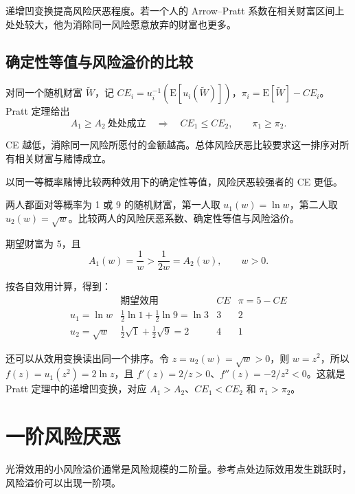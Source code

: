 递增凹变换提高风险厌恶程度。若一个人的 Arrow--Pratt 系数在相关财富区间上处处较大，他为消除同一风险愿意放弃的财富也更多。

\subsection{确定性等值与风险溢价的比较}
\begin{tcolorbox}[knowledge,title=同一风险的 CE 与溢价排序]
对同一个随机财富 $\widetilde W$，记 $CE_i=u_i^{-1}(\mathrm E[u_i(\widetilde W)])$，$\pi_i=\mathrm E[\widetilde W]-CE_i$。Pratt 定理给出
\[
 A_1\ge A_2\ \text{处处成立}
 \quad\Longrightarrow\quad CE_1\le CE_2,\qquad\pi_1\ge\pi_2.
\]
\end{tcolorbox}
CE 越低，消除同一风险所愿付的金额越高。总体风险厌恶比较要求这一排序对所有相关财富与赌博成立。

 以同一等概率赌博比较两种效用下的确定性等值，风险厌恶较强者的 CE 更低。


\begin{tcolorbox}[example,title=课堂例题：对数与平方根效用的比较]
\begin{question}
两人都面对等概率为 1 或 9 的随机财富，第一人取 $u_1(w)=\ln w$，第二人取 $u_2(w)=\sqrt w$。比较两人的风险厌恶系数、确定性等值与风险溢价。
\end{question}
\begin{solution}[blank-type=manual,blank-vsep=5\baselineskip]
期望财富为 5，且
\[
 A_1(w)=\frac1w>\frac1{2w}=A_2(w),\qquad w>0.
\]

按各自效用计算，得到：
\[
\begin{array}{c|c|c|c}
 &\text{期望效用}&CE&\pi=5-CE\\\hline
 u_1=\ln w&\tfrac12\ln1+\tfrac12\ln9=\ln3&3&2\\
 u_2=\sqrt w&\tfrac12\sqrt1+\tfrac12\sqrt9=2&4&1
\end{array}
\]

还可以从效用变换读出同一个排序。令 $z=u_2(w)=\sqrt w>0$，则 $w=z^2$，所以 $f(z)=u_1(z^2)=2\ln z$，且 $f'(z)=2/z>0$、$f''(z)=-2/z^2<0$。这就是 Pratt 定理中的递增凹变换，对应 $A_1>A_2$、$CE_1<CE_2$ 和 $\pi_1>\pi_2$。
\end{solution}
\end{tcolorbox}

\section{一阶风险厌恶}\label{sec:wj-seven-6}
光滑效用的小风险溢价通常是风险规模的二阶量。参考点处边际效用发生跳跃时，风险溢价可以出现一阶项。
